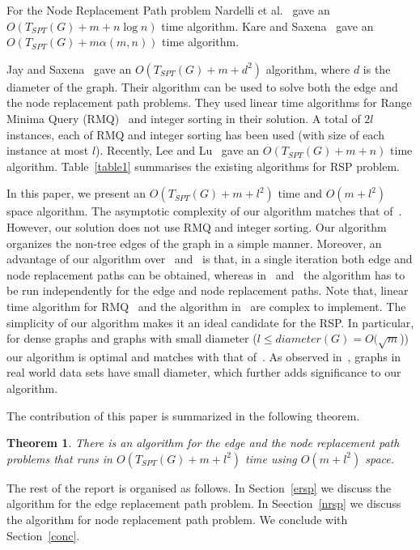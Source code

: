 \documentclass[11pt,a4paper]{llncs}
\newtheorem{thm}{Theorem}
\begin{document}
For the Node Replacement Path problem Nardelli et al.~\cite{mostvn} gave an $O(T_{SPT}(G)+ m + n \log n)$
time algorithm. Kare and Saxena~\cite{asksax} gave an $O(T_{SPT}(G)+ m \alpha(m, n))$ time algorithm.

Jay and Saxena~\cite{jay} gave an $O(T_{SPT}(G)+ m + d^2)$ algorithm, where $d$ is the diameter of the graph.
Their algorithm can be used to solve both the edge and the node
replacement path problems. They used linear time algorithms for Range Minima Query
(RMQ)~\cite{rmq} and integer sorting in their solution. A total of $2l$ instances, each of
RMQ and integer sorting has been used (with size of each instance at most $l$).
Recently, Lee and Lu~\cite{linearrsp} gave an $O(T_{SPT}(G)+ m + n)$ time algorithm.
Table~\ref{table1} summarises the existing algorithms for RSP problem.

In this paper, we present an $O(T_{SPT}(G)+ m + l^2)$ time and $O(m + l^2)$ space algorithm.
The asymptotic complexity of our algorithm matches that of~\cite{jay}. However, our solution does not use RMQ
and integer sorting. Our algorithm organizes the non-tree edges of the graph in a simple manner.
Moreover, an advantage of our algorithm over~\cite{jay} and~\cite{linearrsp} is that, in a single iteration both
edge and node replacement paths can be obtained, whereas in~\cite{jay} and~\cite{linearrsp} the algorithm has to
be run independently for the edge and node replacement paths. Note that, linear time algorithm for RMQ~\cite{rmq}
and the algorithm in~\cite{linearrsp} are complex to implement. The simplicity of our algorithm
makes it an ideal candidate for the RSP. In particular, for dense graphs and graphs with small diameter
($l \leq diameter(G) = O(\sqrt m$)) our algorithm is optimal and matches with that of~\cite{linearrsp}.
As observed in~\cite{jay}, graphs in real world data sets have small diameter, which further adds significance
to our algorithm.

The contribution of this paper is summarized in the following theorem.

\begin{thm}
\label{thm1}
There is an algorithm for the edge and the node replacement path problems that runs in
$O(T_{SPT}(G)+ m + l^2)$ time using $O(m + l^2)$ space.
\end{thm}

The rest of the report is organised as follows. In Section~\ref{ersp} we discuss the
algorithm for the edge replacement path problem. In Seection~\ref{nrsp} we discuss the
algorithm for node replacement path problem. We conclude with Section~\ref{conc}.
\end{document}
